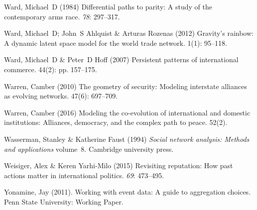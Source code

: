 \documentclass[3p,times,twocolumn,authoryear,12pt]{elsarticle}
\begin{document}
\begin{thebibliography}{}
Ward, Michael~D (1984) Differential paths to parity: A study of the
  contemporary arms race.
 {\em {78}}: 297--317.

Ward, Michael~D; John~S Ahlquist  \& Arturas Rozenas (2012) Gravity's rainbow:
  A dynamic latent space model for the world trade network.
 { 1\/}(1): 95--118.

Ward, Michael~D  \& Peter~D Hoff (2007) Persistent patterns of international
  commerce.
 { 44\/}(2): pp. 157--175.

Warren, Camber (2010) The geometry of security: Modeling interstate alliances
  as evolving networks.
 { 47\/}(6): 697--709.

Warren, Camber (2016) Modeling the co-evolution of international and domestic
  institutions: Alliances, democracy, and the complex path to peace.
 { 52\/}(2).

Wasserman, Stanley  \& Katherine Faust (1994) {\em Social network analysis:
  Methods and applications} volume~8.
\newblock Cambridge university press.

Weisiger, Alex  \& Keren Yarhi-Milo (2015) Revisiting reputation: How past
  actions matter in international politics.
 {\em 69}: 473--495.

Yonamine, Jay (2011).
\newblock Working with event data: A guide to aggregation choices.
\newblock Penn State University: Working Paper.

\end{thebibliography}

%  
%
%
\end{document}
